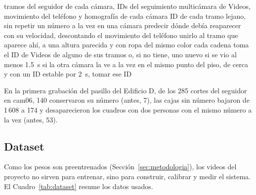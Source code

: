 \documentclass[12pt,a4paper]{article}
\begin{document}
\begin{algorithm}[H]
\caption{IDs de la gente lejana en las grabaciones de una zona}
\label{alg:lejanos}
\begin{algorithmic}[1]
\REQUIRE tramos del seguidor de cada cámara, IDs del seguimiento multicámara de Videos, movimiento del teléfono y homografía de cada cámara
\ENSURE ID de cada tramo lejano, sin repetir un número a la vez en una cámara
  \STATE predecir dónde debía reaparecer con su velocidad, descontando el movimiento del teléfono
  \STATE unirlo al tramo que aparece ahí, a una altura parecida y con ropa del mismo color
\ENDFOR
\STATE cada cadena toma el ID de Videos de alguno de sus tramos o, si no tiene, uno nuevo si se vio al menos 1.5~s
\STATE si la otra cámara la ve a la vez en el mismo punto del piso, de cerca y con un ID estable por 2~s, tomar ese ID
\end{algorithmic}
\end{algorithm}

En la primera grabación del pasillo del Edificio D, de los 285 cortes del
seguidor en cam06, 140 conservaron su número (antes, 7), las cajas sin
número bajaron de 1\,608 a 174 y desaparecieron los cuadros con dos personas
con el mismo número a la vez (antes, 53).

\subsection{Dataset}
\label{sec:dataset}

Como los pesos son preentrenados (Sección~\ref{sec:metodologia}), los videos
del proyecto no sirven para entrenar, sino para construir, calibrar y medir el
sistema. El Cuadro~\ref{tab:dataset} resume los datos usados.
\end{document}
